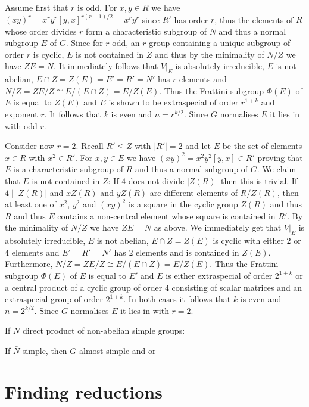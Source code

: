 Assume first that $r$ is odd. For $x,y \in R$ we have $(xy)^r =
x^ry^r[y,x]^{r(r-1)/2} = x^ry^r$ since $R'$ has order $r$, thus the
elements of $R$ whose order divides $r$ form a characteristic 
subgroup of $N$ and thus a normal subgroup $E$ of $G$. Since for
$r$ odd, an $r$-group containing a unique subgroup of order $r$ is
cyclic, $E$ is not contained in $Z$ and thus by the minimality
of $N/Z$ we have $Z E = N$. It immediately follows that $V|_E$
is absolutely irreducible, $E$ is not abelian, 
$E \cap Z = Z(E) = E' = R' = N'$ has $r$ elements and 
$N/Z = ZE/Z \cong E/(E \cap Z) = E/Z(E)$. Thus the Frattini subgroup
$\Phi(E)$ of $E$ is equal to $Z(E)$ and $E$ is shown to be extraspecial
of order $r^{1+k}$ and exponent $r$. It follows that $k$ is even and
$n=r^{k/2}$. Since $G$ normalises $E$ it lies in  with odd $r$.

Consider now $r=2$. Recall $R' \le Z$ with $|R'| = 2$ and
let $E$ be the set of elements $x \in R$ with $x^2 \in R'$. 
For $x,y \in E$ we have $(xy)^2 = x^2y^2[y,x] \in R'$ proving that
$E$ is a characteristic subgroup of $R$ and thus a normal subgroup of
$G$. We claim that $E$ is not contained in $Z$: If $4$ does not divide
$|Z(R)|$ then this is trivial. If $4 \mid |Z(R)|$ and $xZ(R)$ and $yZ(R)$
are different elements of $R/Z(R)$, then at least one of
$x^2$, $y^2$ and $(xy)^2$ is a square in the cyclic group $Z(R)$ and
thus $R$ and thus $E$ contains a non-central element whose square
is contained in $R'$.
By the minimality of $N/Z$ we have $Z E = N$ as above. We immediately
get that $V|_E$ is absolutely irreducible, $E$ is not abelian,
$E \cap Z = Z(E)$ is cyclic with either $2$ or $4$ elements and
$E' = R' = N'$ has $2$ elements and is contained in $Z(E)$.
Furthermore, $N/Z = ZE/Z \cong E/(E \cap Z) = E/Z(E)$. Thus the
Frattini subgroup $\Phi(E)$ of $E$ is equal to $E'$ and $E$ is either
extraspecial of order $2^{1+k}$ or a central product of a cyclic group
of order $4$ consisting of scalar matrices and an extraspecial group 
of order $2^{1+k}$. In both cases it follows that $k$ is even and
$n = 2^{k/2}$. Since $G$ normalises $E$ it lies in  with $r=2$.

If $\bar N$ direct product of non-abelian simple groups: 

If $\bar N$ simple, then $G$ almost simple and  or 

\newpage

\section{Finding reductions}
\label{findred}

